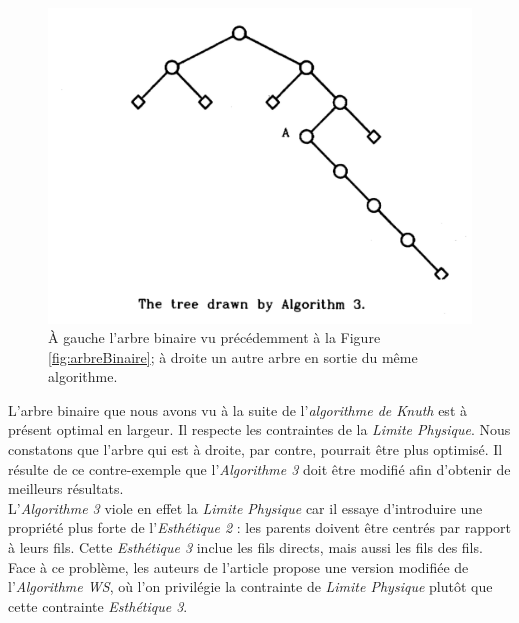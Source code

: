\documentclass{article}
\begin{document}
\begin{figure}[h]
\begin{center}
\begin{left}
      		\end{left}
          \begin{right}
            \includegraphics[scale=0.4]{arbre3.png}
          \end{right}
        \end{center}
    	\caption{À gauche l'arbre binaire vu précédemment à la Figure \ref{fig:arbreBinaire}; à droite un autre arbre en sortie du même algorithme.  \cite{article79}}
      \label{fig:arbresAlgo3}
    \end{figure}
    \vfill


    L'arbre binaire que nous avons vu à la suite de l'\emph{algorithme de Knuth} est à présent optimal en largeur. Il respecte les contraintes de la \emph{Limite Physique}. Nous constatons que l'arbre qui est à droite, par contre, pourrait être plus optimisé. Il résulte de ce contre-exemple que l'\emph{Algorithme 3} doit être modifié afin d'obtenir de meilleurs résultats.\\

    L'\emph{Algorithme 3} viole en effet la \emph{Limite Physique} car il essaye d'introduire une propriété plus forte de l'\emph{Esthétique 2} : les parents doivent être centrés par rapport à leurs fils.
    Cette \emph{Esthétique 3} inclue les fils directs, mais aussi les fils des fils.\\

    Face à ce problème, les auteurs de l'article \cite{article79} propose une version modifiée de l'\emph{Algorithme WS}, où l'on privilégie la contrainte de \emph{Limite Physique} plutôt que cette contrainte \emph{Esthétique 3}.\\
\end{document}
